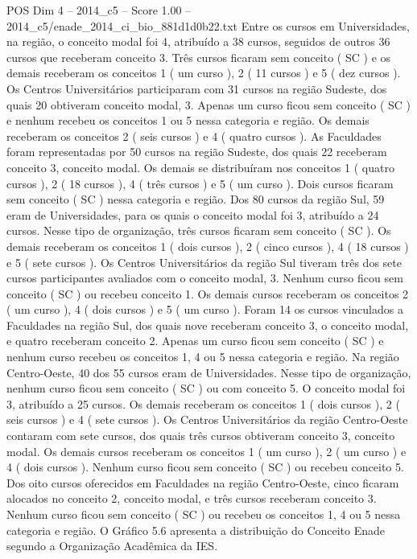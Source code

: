 \begin{textsample}{POS Dim 4 – 2014\_c5 – Score 1.00 – 2014\_c5/enade\_2014\_ci\_bio\_881d1d0b22.txt}
Entre os cursos em Universidades, na região, o conceito modal foi 4, atribuído a 38 cursos, seguidos de outros 36 cursos que receberam conceito 3.
Três cursos ficaram sem conceito ( SC ) e os demais receberam os conceitos 1 ( um curso ), 2 ( 11 cursos ) e 5 ( dez cursos ).
Os Centros Universitários participaram com 31 cursos na região Sudeste, dos quais 20 obtiveram conceito modal, 3.
Apenas um curso ficou sem conceito ( SC ) e nenhum recebeu os conceitos 1 ou 5 nessa categoria e região.
Os demais receberam os conceitos 2 ( seis cursos ) e 4 ( quatro cursos ).
As Faculdades foram representadas por 50 cursos na região Sudeste, dos quais 22 receberam conceito 3, conceito modal.
Os demais se distribuíram nos conceitos 1 ( quatro cursos ), 2 ( 18 cursos ), 4 ( três cursos ) e 5 ( um curso ).
Dois cursos ficaram sem conceito ( SC ) nessa categoria e região.
Dos 80 cursos da região Sul, 59 eram de Universidades, para os quais o conceito modal foi 3, atribuído a 24 cursos.
Nesse tipo de organização, três cursos ficaram sem conceito ( SC ).
Os demais receberam os conceitos 1 ( dois cursos ), 2 ( cinco cursos ), 4 ( 18 cursos ) e 5 ( sete cursos ).
Os Centros Universitários da região Sul tiveram três dos sete cursos participantes avaliados com o conceito modal, 3.
Nenhum curso ficou sem conceito ( SC ) ou recebeu conceito 1.
Os demais cursos receberam os conceitos 2 ( um curso ), 4 ( dois cursos ) e 5 ( um curso ).
Foram 14 os cursos vinculados a Faculdades na região Sul, dos quais nove receberam conceito 3, o conceito modal, e quatro receberam conceito 2.
Apenas um curso ficou sem conceito ( SC ) e nenhum curso recebeu os conceitos 1, 4 ou 5 nessa categoria e região.
Na região Centro-Oeste, 40 dos 55 cursos eram de Universidades.
Nesse tipo de organização, nenhum curso ficou sem conceito ( SC ) ou com conceito 5.
O conceito modal foi 3, atribuído a 25 cursos.
Os demais receberam os conceitos 1 ( dois cursos ), 2 ( seis cursos ) e 4 ( sete cursos ).
Os Centros Universitários da região Centro-Oeste contaram com sete cursos, dos quais três cursos obtiveram conceito 3, conceito modal.
Os demais cursos receberam os conceitos 1 ( um curso ), 2 ( um curso ) e 4 ( dois cursos ).
Nenhum curso ficou sem conceito ( SC ) ou recebeu conceito 5.
Dos oito cursos oferecidos em Faculdades na região Centro-Oeste, cinco ficaram alocados no conceito 2, conceito modal, e três cursos receberam conceito 3.
Nenhum curso ficou sem conceito ( SC ) ou recebeu os conceitos 1, 4 ou 5 nessa categoria e região.
O Gráfico 5.6 apresenta a distribuição do Conceito Enade segundo a Organização Acadêmica da IES.

\end{textsample}
